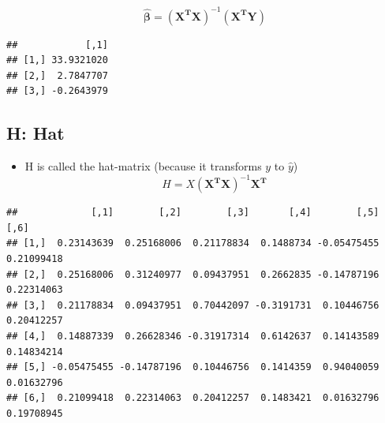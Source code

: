 \documentclass[
]{article}
\newenvironment{Shaded}{\begin{snugshade}}{\end{snugshade}}
\newcommand{\KeywordTok}[1]{\textcolor[rgb]{0.13,0.29,0.53}{\textbf{#1}}}
\newcommand{\NormalTok}[1]{#1}
\newcommand{\OperatorTok}[1]{\textcolor[rgb]{0.81,0.36,0.00}{\textbf{#1}}}
\newcommand{\StringTok}[1]{\textcolor[rgb]{0.31,0.60,0.02}{#1}}
\providecommand{\tightlist}{%
  \setlength{\itemsep}{0pt}\setlength{\parskip}{0pt}}
\begin{document}
\[
\boldsymbol{\hat{\beta}} = \boldsymbol{(X^TX)}^{-1}\boldsymbol{(X^TY)}
\]

\begin{Shaded}
\end{Shaded}

\begin{verbatim}
##            [,1]
## [1,] 33.9321020
## [2,]  2.7847707
## [3,] -0.2643979
\end{verbatim}

\hypertarget{h-hat}{%
\subsection{H: Hat}\label{h-hat}}

\begin{itemize}
\tightlist
\item
  H is called the hat-matrix (because it transforms \(y\) to
  \(\hat{y}\)) \[
  H = X\boldsymbol{(X^TX)}^{-1}\boldsymbol{X^T}
  \]
\end{itemize}

\begin{Shaded}
\end{Shaded}

\begin{verbatim}
##             [,1]        [,2]        [,3]       [,4]        [,5]       [,6]
## [1,]  0.23143639  0.25168006  0.21178834  0.1488734 -0.05475455 0.21099418
## [2,]  0.25168006  0.31240977  0.09437951  0.2662835 -0.14787196 0.22314063
## [3,]  0.21178834  0.09437951  0.70442097 -0.3191731  0.10446756 0.20412257
## [4,]  0.14887339  0.26628346 -0.31917314  0.6142637  0.14143589 0.14834214
## [5,] -0.05475455 -0.14787196  0.10446756  0.1414359  0.94040059 0.01632796
## [6,]  0.21099418  0.22314063  0.20412257  0.1483421  0.01632796 0.19708945
\end{verbatim}
\end{document}
